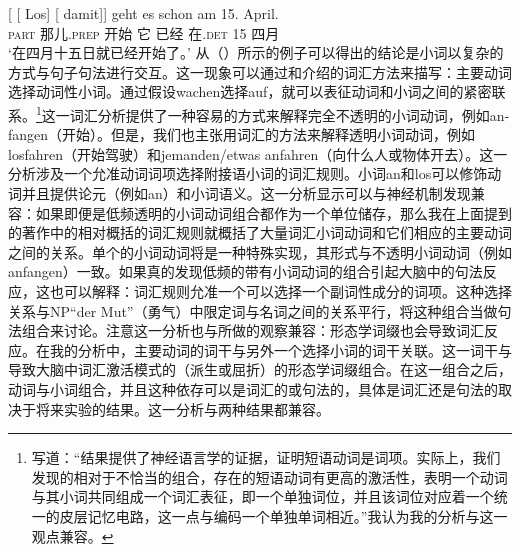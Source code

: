 \begin{exe}
\begin{xlist}[iv.]
\begin{exe}
\begin{xlist}[iv.]
\ex
\gll {}[ [ Los]        [ damit]]    geht es schon   am 15. April.\footnotemark\\
       {}        {}        \textsc{part}  {}        那儿.\textsc{prep} 开始 它 已经 在.\textsc{det} 15 四月\\%
%
\glt `在四月十五日就已经开始了。'
\zl
从（）所示的例子可以得出的结论是小词以复杂的方式与句子句法进行交互。这一现象可以通过和介绍的词汇方法来描写：主要动词选择动词性小词。通过假设wachen选择auf，就可以表征动词和小词之间的紧密联系。\footnote{%
  \citet[]{CSP2010a}写道：“结果提供了神经语言学的证据，证明短语动词是词项。实际上，我们发现的相对于不恰当的组合，存在的短语动词有更高的激活性，表明一个动词与其小词共同组成一个词汇表征，即一个单独词位，并且该词位对应着一个统一的皮层记忆电路，这一点与编码一个单独单词相近。”我认为我的分析与这一观点兼容。
}这一词汇分析提供了一种容易的方式来解释完全不透明的小词动词，例如an-fangen（开始）。但是，我们也主张用词汇的方法来解释透明小词动词，例如losfahren（开始驾驶）和jemanden/etwas anfahren（向什么人或物体开去）。这一分析涉及一个允准动词词项选择附接语小词的词汇规则。小词an和los可以修饰动词并且提供论元（例如an）和小词语义。这一分析显示可以与神经机制发现兼容：如果即便是低频透明的小词动词组合都作为一个单位储存，那么我在上面提到的著作中的相对概括的词汇规则就概括了大量词汇小词动词和它们相应的主要动词之间的关系。单个的小词动词将是一种特殊实现，其形式与不透明小词动词（例如anfangen）一致。如果真的发现低频的带有小词动词的组合引起大脑中的句法反应，这也可以解释：词汇规则允准一个可以选择一个副词性成分的词项。这种选择关系与NP“der Mut”（勇气）中限定词与名词之间的关系平行，\citet[]{CSP2010a}将这种组合当做句法组合来讨论。注意这一分析也与\citet*{SPP2005a-u}所做的观察兼容：形态学词缀也会导致词汇反应。在我的分析中，主要动词的词干与另外一个选择小词的词干关联。这一词干与导致大脑中词汇激活模式的（派生或屈折）的形态学词缀组合。在这一组合之后，动词与小词组合，并且这种依存可以是词汇的或句法的，具体是词汇还是句法的取决于将来实验的结果。这一分析与两种结果都兼容。

\end{xlist}
\end{exe}
\end{xlist}
\end{exe}
